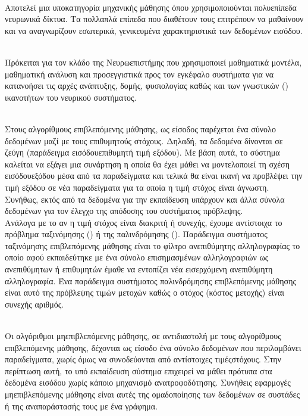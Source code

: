 \begin{description}
    \item[Βαθιά Μάθηση] \hfill \\ Αποτελεί μια υποκατηγορία μηχανικής μάθησης όπου χρησιμοποιούνται πολυεπίπεδα νευρωνικά δίκτυα. Τα πολλαπλά επίπεδα που διαθέτουν τους επιτρέπουν να μαθαίνουν και να αναγνωρίζουν εσωτερικά, γενικευμένα χαρακτηριστικά των δεδομένων εισόδου.
    \hypertarget{_computational_neuroscience}{
    \item[Υπολογιστική Νευροεπιστήμη (\en{Computational Neuroscience})]} \hfill \\Πρόκειται για τον κλάδο της Νευρωεπιστήμης που χρησιμοποιεί μαθηματικά μοντέλα, μαθηματική ανάλυση και προσεγγιστικά προς τον εγκέφαλο συστήματα για να κατανοήσει τις αρχές ανάπτυξης, δομής, φυσιολογίας καθώς και των γνωστικών () ικανοτήτων του νευρικού συστήματος.
    \item[Επιβλεπόμενη Μάθηση] \hfill \\ Στους αλγορίθμους επιβλεπόμενης μάθησης, ως είσοδος παρέχεται ένα σύνολο δεδομένων μαζί με τους επιθυμητούς στόχους. Δηλαδή, τα δεδομένα δίνονται σε ζεύγη (παράδειγμα εισόδου\textemdash επιθυμητή τιμή εξόδου). Με βάση αυτά, το σύστημα καλείται να εξάγει μια συνάρτηση η οποία θα έχει μάθει να μοντελοποιεί τη σχέση εισόδου\textendash εξόδου μέσα από τα παραδείγματα και τελικά θα είναι ικανή να προβλέψει την τιμή εξόδου σε νέα παραδείγματα για τα οποία η τιμή στόχος είναι άγνωστη. Συνήθως, εκτός από τα δεδομένα για την εκπαίδευση υπάρχουν και άλλα σύνολα δεδομένων για τον έλεγχο της απόδοσης του συστήματος πρόβλεψης.\\
    Ανάλογα με το αν η τιμή στόχος είναι διακριτή ή συνεχής, έχουμε αντίστοιχα το πρόβλημα ταξινόμησης () ή της παλινδρόμησης (). Παράδειγμα συστήματος ταξινόμησης επιβλεπόμενης μάθησης είναι το φίλτρο ανεπιθύμητης αλληλογραφίας το οποίο αφού εκπαιδεύτηκε με ένα σύνολο επισημασμένων αλληλογραφιών ως ανεπιθύμητων ή επιθυμητών έμαθε να εντοπίζει νέα εισερχόμενη ανεπιθύμητη αλληλογραφία. Ένα παράδειγμα συστήματος παλινδρόμησης επιβλεπόμενης μάθησης είναι αυτό της πρόβλεψης τιμών μετοχών καθώς ο στόχος (κόστος μετοχής) είναι συνεχής αριθμός.

    \item[Μη-επιβλεπόμενη Μάθηση] \hfill \\ Οι αλγόριθμοι μη\textendash επιβλεπόμενης μάθησης, σε αντιδιαστολή με τους αλγορίθμους επιβλεπόμενης μάθησης, δέχονται ως είσοδο ένα σύνολο δεδομένων που περιλαμβάνει παραδείγματα, χωρίς όμως να συνοδεύονται από αντίστοιχες τιμές\textendash στόχους. Στην περίπτωση αυτή, το υπό εκπαίδευση σύστημα επιχειρεί να μάθει πρότυπα στα δεδομένα εισόδου χωρίς κάποιο μηχανισμό ανατροφοδότησης. Συνήθεις εφαρμογές μη\textendash επιβλεπόμενης μάθησης είναι αυτές της ομαδοποίησης των δεδομένων σε συστάδες ή της αναπαράστασής τους με ένα γράφημα.
    

\end{description}
